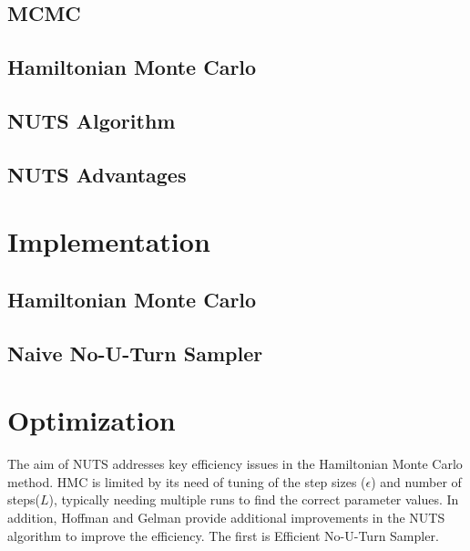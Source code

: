 \documentclass[12pt]{article}
\begin{document}
\subsection{MCMC}

\subsection{Hamiltonian Monte Carlo}

\subsection{NUTS Algorithm}

\subsection{NUTS Advantages}



\section{Implementation}
\subsection{Hamiltonian Monte Carlo}
\subsection{Naive No-U-Turn Sampler}

\section{Optimization}
The aim of NUTS addresses key efficiency issues in the Hamiltonian Monte Carlo method. HMC is limited by its need of tuning of the step sizes ($\epsilon$) and number of steps($L$), typically needing multiple runs to find the correct parameter values. In addition, Hoffman and Gelman provide additional improvements in the NUTS algorithm to improve the efficiency. The first is Efficient No-U-Turn Sampler.
\end{document}
